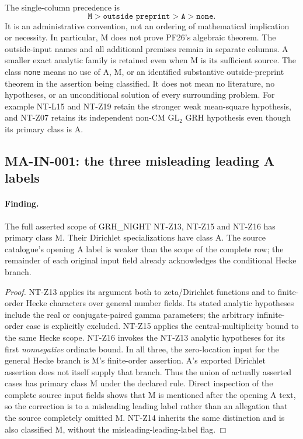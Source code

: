 The single-column precedence is
\[
 \texttt{M}>\texttt{outside preprint}>\texttt{A}>\texttt{none}.
\]
It is an administrative convention, not an ordering of mathematical
implication or necessity.  In particular, M does not prove PF26's
algebraic theorem.  The outside-input names and all additional premises
remain in separate columns.  A smaller exact analytic family is retained
even when M is its sufficient source.  The class \texttt{none} means no
use of A, M, or an identified substantive outside-preprint theorem in the
assertion being classified.  It does not mean no literature, no
hypotheses, or an unconditional solution of every surrounding problem.
For example NT-L15 and NT-Z19 retain the stronger weak mean-square
hypothesis, and NT-Z07 retains its independent non-CM $\mathrm{GL}_2$
GRH hypothesis even though its primary class is A.

\subsection{MA-IN-001: the three misleading leading A labels}

\paragraph{Finding.}
The full asserted scope of GRH\_NIGHT NT-Z13, NT-Z15 and NT-Z16 has
primary class M.  Their Dirichlet specializations have class A.  The
source catalogue's opening A label is weaker than the scope of the
complete row; the remainder of each original input field already
acknowledges the conditional Hecke branch.

\begin{proof}
NT-Z13 applies its argument both to zeta/Dirichlet functions and to
finite-order Hecke characters over general number fields.  Its stated
analytic hypotheses include the real or conjugate-paired gamma
parameters; the arbitrary infinite-order case is explicitly excluded.
NT-Z15 applies the central-multiplicity bound to the same Hecke scope.
NT-Z16 invokes the NT-Z13 analytic hypotheses for its first
\emph{nonnegative} ordinate bound.  In all three, the zero-location
input for the general Hecke branch is M's finite-order assertion.
A's exported Dirichlet assertion does not itself supply that branch.
Thus the union of actually asserted cases has primary class M under the
declared rule.  Direct inspection of the complete source input fields
shows that M is mentioned after the opening A text, so the correction
is to a misleading leading label rather than an allegation that the
source completely omitted M.  NT-Z14 inherits the same distinction and
is also classified M, without the misleading-leading-label flag.
\end{proof}

